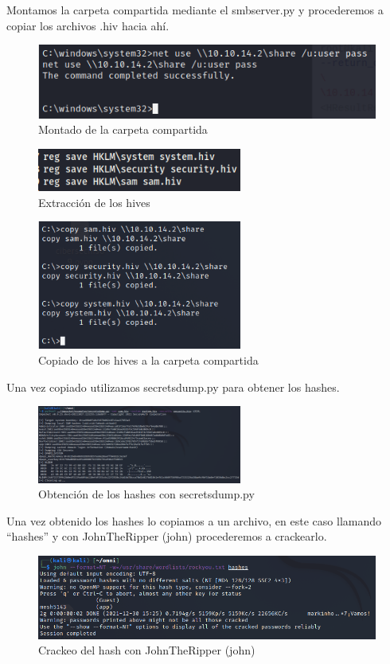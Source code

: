 \documentclass{article}
\begin{document}
Montamos la carpeta compartida mediante el smbserver.py y procederemos a copiar los archivos .hiv hacia ahí.
\begin{figure}[H]
	\center
	\includegraphics[width=\textwidth]{images/omni/12.png}
	\caption{Montado de la carpeta compartida}
\end{figure}
\begin{figure}[H]
	\center
	\includegraphics[width=0.6\textwidth]{images/omni/13.png}
	\caption{Extracción de los hives}
\end{figure}
\begin{figure}[H]
	\center
	\includegraphics[width=0.6\textwidth]{images/omni/14.png}
	\caption{Copiado de los hives a la carpeta compartida}
\end{figure}

Una vez copiado utilizamos secretsdump.py para obtener los hashes.
\begin{figure}[H]
	\center
	\includegraphics[width=0.6\textwidth]{images/omni/15.png}
	\caption{Obtención de los hashes con secretsdump.py}
\end{figure}

Una vez obtenido los hashes lo copiamos a un archivo, en este caso llamando “hashes” y con JohnTheRipper (john) procederemos a crackearlo.
\begin{figure}[H]
	\center
	\includegraphics[width=\textwidth]{images/omni/16.png}
	\caption{Crackeo del hash con JohnTheRipper (john)}
\end{figure}
\end{document}
